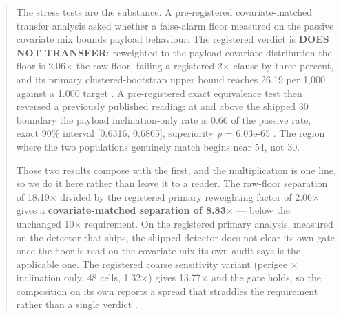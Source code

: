 \documentclass[11pt]{article}
\begin{document}
\begin{abstract}
The stress tests are the substance. A pre-registered covariate-matched transfer analysis asked whether a false-alarm floor measured on the passive covariate mix bounds payload behaviour. The registered verdict is \textbf{DOES NOT TRANSFER}: reweighted to the payload covariate distribution the floor is 2.06$\times$ the raw floor, failing a registered 2$\times$ clause by three percent, and its primary clustered-bootstrap upper bound reaches 26.19 per 1,000 against a 1.000 target%
. A pre-registered exact equivalence test then reversed a previously published reading: at and above the shipped 30\textdegree{} boundary the payload inclination-only rate is 0.66 of the passive rate, exact 90\% interval [0.6316, 0.6865], superiority \emph{p} = 6.03e-65%
. The region where the two populations genuinely match begins near 54\textdegree{}, not 30\textdegree{}.

Those two results compose with the first, and the multiplication is one line, so we do it here rather than leave it to a reader. The raw-floor separation of 18.19$\times$ divided by the registered primary reweighting factor of 2.06$\times$ gives a \textbf{covariate-matched separation of 8.83$\times$} --- below the unchanged 10$\times$ requirement. On the registered primary analysis, measured on the detector that ships, the shipped detector does not clear its own gate once the floor is read on the covariate mix its own audit says is the applicable one. The registered coarse sensitivity variant (perigee $\times$ inclination only, 48 cells, 1.32$\times$) gives 13.77$\times$ and the gate holds, so the composition on its own reports a spread that straddles the requirement rather than a single verdict%
.


\end{abstract}
\end{document}
